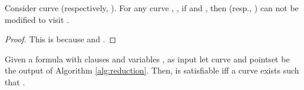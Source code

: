 \documentclass[a4paper,UKenglish]{lipics}
\begin{document}
\begin{lemma}\label{lemma:NOTABCanSeeC}
Consider curve  (respectively, ).
For any curve , ,
if  and ,   
then  (resp., ) can not be modified to visit .
\end{lemma}
\begin{proof}
This is because 
and .
\end{proof}









\vspace{0.5 in}

\begin{theorem}
Given a formula  with  clauses  and  variables ,
as input let curve  and pointset  be the output of Algorithm \ref{alg:reduction}. 
Then,  is satisfiable iff a 
curve  exists such that 
.
\end{theorem}
\end{document}
